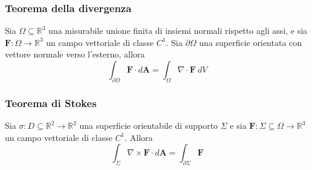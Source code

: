             \subsubsection{Teorema della divergenza}
                \begin{theorem}
                    Sia $\Omega \subseteq \mathbb{R}^{3}$ una misurabile unione finita di insiemi normali rispetto agli assi, e sia $\mathbf{F}: \Omega \rightarrow \mathbb{R}^{3}$ un campo vettoriale di classe $C^{1}$.
                    Sia $\partial \Omega$ una superficie orientata con vettore normale verso l'esterno, allora
                    \[
                        \int_{\partial \Omega} \mathbf{F} \cdot d \mathbf{A} = \int_{\Omega} \nabla \cdot \mathbf{F} \: dV
                    \]
                \end{theorem}

            \subsubsection{Teorema di Stokes}
                \begin{theorem}
                    Sia $\sigma: D \subseteq \mathbb{R}^2 \rightarrow \mathbb{R}^{2}$ una superficie orientabile di supporto $\Sigma$ e sia $\mathbf{F}: \Sigma \subseteq \Omega \rightarrow \mathbb{R}^{3}$ un campo vettoriale di classe $C^{1}$.
                    Allora
                    \[
                        \int_{\Sigma} \nabla \times \mathbf{F} \cdot d \mathbf{A} = \int_{\partial \Sigma} \mathbf{F}
                    \]
                \end{theorem}
